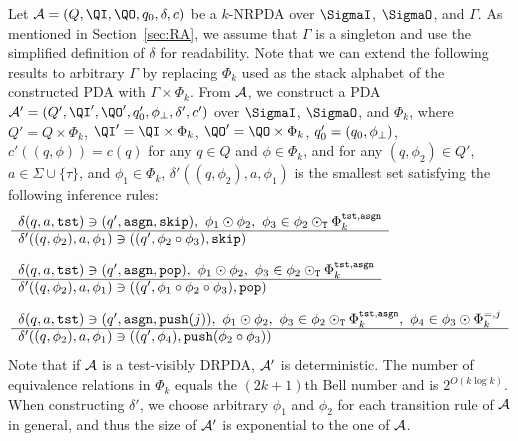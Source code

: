 \smallskip

Let $\calA=(Q,\QI,\QO,q_0,\delta,c)$ be a $k$-NRPDA
over $\SigmaI$, $\SigmaO$, and $\Gamma$.
As mentioned in Section~\ref{sec:RA},
we assume that $\Gamma$ is a singleton and
use the simplified definition of $\delta$ for readability.
Note that we can extend the following results to arbitrary $\Gamma$
by replacing $\Phi_k$ used as the stack alphabet of
the constructed PDA with $\Gamma\times\Phi_k$.
%
From ${\cal A}$, we construct a PDA
$\calA'=(Q',\QI',\QO',q'_0,\phizero,\delta',c')$
over $\SigmaI$, $\SigmaO$, and $\Phi_k$,
where $Q'=Q\times\Phi_k$, $\QI'=\QI\times\Phi_k$, $\QO'=\QO\times\Phi_k$,
$q'_0=(q_0,\phi_{\bot})$,
$c'((q,\phi))=c(q)$ for any $q\in Q$ and $\phi\in\Phi_k$,
and for any $(q,\phi_2)\in Q'$, $a\in\Sigma\cup\{\tau\}$,
and $\phi_1\in\Phi_k$,
$\delta'((q,\phi_2),a,\phi_1)$ is the smallest set
satisfying the following inference rules:
%
\begin{align}
&
\begin{array}{l}
  \delta(q,a,\tst) \ni (q',\asgn,\skip), \
  \phi_1\COMPBL\phi_2, \
  \phi_3\in \phi_2\COMPBLT\Phi_k^{\tst,\asgn}
  \\ \hline
  \delta'((q,\phi_2),a,\phi_1) \ni ((q',\phi_2\COMP\phi_3),\skip)
\end{array}\label{eq: PDAtoRPDA1}
%
\\[\medskipamount]
&
\begin{array}{l}
  \delta(q,a,\tst) \ni (q',\asgn,\pop), \
  \phi_1\COMPBL\phi_2, \
  \phi_3\in \phi_2\COMPBLT\Phi_k^{\tst,\asgn}
  \\ \hline
  \delta'((q,\phi_2),a,\phi_1) \ni ((q',\phi_1\COMP\phi_2\COMP\phi_3),\pop)
\end{array}\label{eq: PDAtoRPDA2}
%
\\[\medskipamount]
&
\begin{array}{l}
  \delta(q,a,\tst) \ni (q',\asgn,\push(j)), \
  \phi_1\COMPBL\phi_2, \
  \phi_3\in \phi_2\COMPBLT\Phi_k^{\tst,\asgn}, \
  \phi_4\in \phi_3\COMPBL\Phi_k^{=,j}
  \\ \hline
  \delta'((q,\phi_2),a,\phi_1) \ni ((q',\phi_4),\push(\phi_2\COMP\phi_3))
\end{array}\label{eq: PDAtoRPDA3}
%
\end{align}
Note that if ${\cal A}$ is a test-visibly DRPDA,
${\cal A}'$ is deterministic.
The number of equivalence relations in $\Phi_k$ equals
the $(2k+1)$th Bell number
and is $2^{O(k\log k)}$.
When constructing $\delta'$,
we choose arbitrary $\phi_1$ and $\phi_2$ for each transition rule of
${\cal A}$ in general,
and thus the size of ${\cal A}'$ is exponential to the one of ${\cal A}$.


